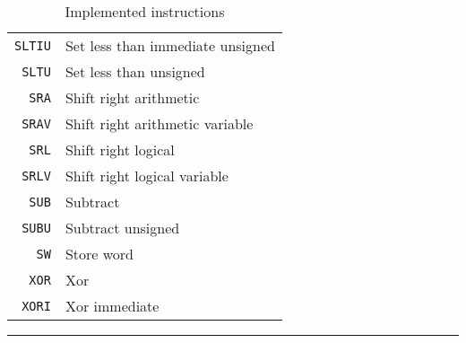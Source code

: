 \begin{table}[h]
\begin{center}
\begin{tabular}{r|l}
            \texttt{SLTIU} & Set less than immediate unsigned \\
            \texttt{SLTU} & Set less than unsigned \\
            \texttt{SRA} & Shift right arithmetic \\
            \texttt{SRAV} & Shift right arithmetic variable \\
            \texttt{SRL} & Shift right logical \\
            \texttt{SRLV} & Shift right logical variable \\
            \texttt{SUB} & Subtract \\
            \texttt{SUBU} & Subtract unsigned \\
            \texttt{SW} & Store word \\
            \texttt{XOR} & Xor \\
            \texttt{XORI} & Xor immediate \\
        \end{tabular}
        \smallskip
        \hrule
        \smallskip
        \caption{Implemented instructions}
        \label{table:implemented-instructions}
    \end{center}
\end{table}
